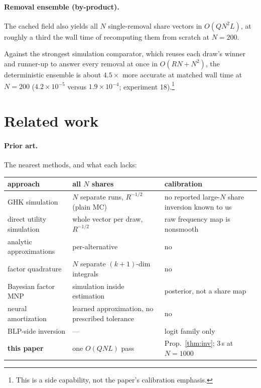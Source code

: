 \documentclass[12pt]{article}
\theoremstyle{remark}
\begin{document}
\paragraph{Removal ensemble (by-product).} The cached field also yields
all $N$ single-removal share vectors in $O(QN^2L)$, at roughly a third
the wall time of recomputing them from scratch at $N=200$.

Against the strongest simulation comparator, which reuses each draw's
winner and runner-up to answer every removal at once in $O(RN + N^2)$, the
deterministic ensemble is about $4.5\times$ more accurate at matched wall
time at $N=200$ ($4.2\times10^{-5}$ versus $1.9\times10^{-4}$;
experiment 18).\footnote{This is a side capability, not the paper's calibration emphasis.}

\section{Related work}\label{sec:related}

\paragraph{Prior art.} The nearest methods, and what each lacks:
\nopagebreak[4]

\begin{center}
\footnotesize
\setlength{\tabcolsep}{5pt}
\renewcommand{\arraystretch}{1.25}
\begin{tabular}{|p{4.1cm}|p{4.1cm}|p{4.5cm}|}
\hline
\textbf{approach} & \textbf{all $N$ shares} & \textbf{calibration} \\
\hline
GHK simulation \citep{geweke1994,hajivassiliou1998} & $N$ separate runs, $R^{-1/2}$ (plain MC) & no reported large-$N$ share inversion known to us \\
\hline
direct utility simulation & whole vector per draw, $R^{-1/2}$ & raw frequency map is nonsmooth \\
\hline
analytic approximations \citep{bhat2011,connors2014} & per-alternative & no \\
\hline
factor quadrature \citep{butler1982,elrod1995} & $N$ separate $(k{+}1)$-dim integrals & no \\
\hline
Bayesian factor MNP \citep{loaiza2022} & simulation inside estimation & posterior, not a share map \\
\hline
neural amortization \citep{huch2026} & learned approximation, no prescribed tolerance & no \\
\hline
BLP-side inversion \citep{berry1995,conlon2020} & --- & logit family only \\
\hline
\textbf{this paper} & one $O(QNL)$ pass & Prop.~\ref{thm:inv}; 3\,s at $N{=}1000$ \\
\hline
\end{tabular}
\end{center}
\end{document}
